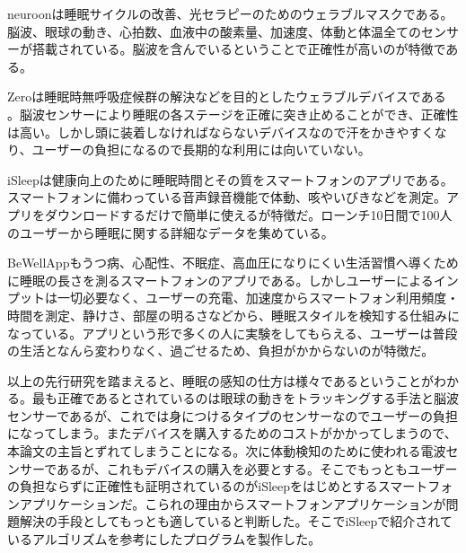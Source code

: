neuroonは睡眠サイクルの改善、光セラピーのためのウェラブルマスクである。脳波、眼球の動き、心拍数、血液中の酸素量、加速度、体動と体温全てのセンサーが搭載されている\cite{neuroon}。脳波を含んでいるということで正確性が高いのが特徴である。

Zeroは睡眠時無呼吸症候群の解決などを目的としたウェラブルデバイスである \cite{beWellApp}。脳波センサーにより睡眠の各ステージを正確に突き止めることができ、正確性は高い。しかし頭に装着しなければならないデバイスなので汗をかきやすくなり、ユーザーの負担になるので長期的な利用には向いていない。

iSleepは健康向上のために睡眠時間とその質をスマートフォンのアプリである。スマートフォンに備わっている音声録音機能で体動、咳やいびきなどを測定\cite{iSleep}。アプリをダウンロードするだけで簡単に使えるが特徴だ。ローンチ10日間で100人のユーザーから睡眠に関する詳細なデータを集めている。

BeWellAppもうつ病、心配性、不眠症、高血圧になりにくい生活習慣へ導くために睡眠の長さを測るスマートフォンのアプリである。しかしユーザーによるインプットは一切必要なく、ユーザーの充電、加速度からスマートフォン利用頻度・時間を測定、静けさ、部屋の明るさなどから、睡眠スタイルを検知する仕組みになっている\cite{beWellApp}。アプリという形で多くの人に実験をしてもらえる、ユーザーは普段の生活となんら変わりなく、過ごせるため、負担がかからないのが特徴だ。

以上の先行研究を踏まえると、睡眠の感知の仕方は様々であるということがわかる。最も正確であるとされているのは眼球の動きをトラッキングする手法と脳波センサーであるが、これでは身につけるタイプのセンサーなのでユーザーの負担になってしまう。またデバイスを購入するためのコストがかかってしまうので、本論文の主旨とずれてしまうことになる。次に体動検知のために使われる電波センサーであるが、これもデバイスの購入を必要とする。そこでもっともユーザーの負担ならずに正確性も証明されているのがiSleepをはじめとするスマートフォンアプリケーションだ。こられの理由からスマートフォンアプリケーションが問題解決の手段としてもっとも適していると判断した。そこでiSleepで紹介されているアルゴリズムを参考にしたプログラムを製作した。

